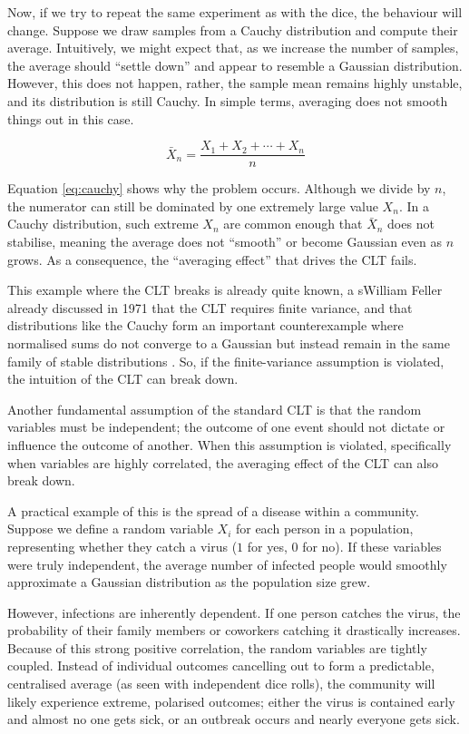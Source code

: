 \documentclass{article}
\begin{document}
Now, if we try to repeat the same experiment as with the dice, the behaviour will change. Suppose we draw samples from a Cauchy distribution and compute their average. Intuitively, we might expect that, as we increase the number of samples, the average should “settle down” and appear to resemble a Gaussian distribution. However, this does not happen, rather, the sample mean remains highly unstable, and its distribution is still Cauchy. In simple terms, averaging does not smooth things out in this case.

\begin{equation}
\bar{X}_n = \frac{X_1 + X_2 + \cdots + X_n}{n}
\label{eq:cauchy}
\end{equation}

 Equation \ref{eq:cauchy} shows why the problem occurs. Although we divide by \textit{$n$}, the numerator can still be dominated by one extremely large value \textit{$X_n$}. In a Cauchy distribution, such extreme \textit{$X_n$} are common enough that $\bar{X}_n$ does not stabilise, meaning the average does not “smooth” or become Gaussian even as $n$ grows. As a consequence, the “averaging effect” that drives the CLT fails.

This example where the CLT breaks is already quite known, a sWilliam Feller already discussed in 1971 that the CLT requires finite variance, and that distributions like the Cauchy form an important counterexample where normalised sums do not converge to a Gaussian but instead remain in the same family of stable distributions \cite{feller1971probability}. So, if the finite-variance assumption is violated, the intuition of the CLT can break down.

Another fundamental assumption of the standard CLT is that the random variables must be independent; the outcome of one event should not dictate or influence the outcome of another. When this assumption is violated, specifically when variables are highly correlated, the averaging effect of the CLT can also break down.

A practical example of this is the spread of a disease within a community. Suppose we define a random variable $X_i$ for each person in a population, representing whether they catch a virus ($1$ for yes, $0$ for no). If these variables were truly independent, the average number of infected people would smoothly approximate a Gaussian distribution as the population size grew. 

However, infections are inherently dependent. If one person catches the virus, the probability of their family members or coworkers catching it drastically increases. Because of this strong positive correlation, the random variables are tightly coupled. Instead of individual outcomes cancelling out to form a predictable, centralised average (as seen with independent dice rolls), the community will likely experience extreme, polarised outcomes; either the virus is contained early and almost no one gets sick, or an outbreak occurs and nearly everyone gets sick. 
\end{document}
